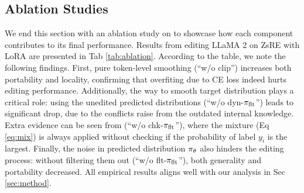 




\subsection{Ablation Studies}
\label{sec:exp:ablation}

We end this section with an ablation study on {\NAME} to showcase how each component contributes to its final performance.
Results from editing LLaMA 2 on ZsRE with LoRA are presented in Tab \ref{tab:ablation}. 
According to the table, we note the following findings. 
First, pure token-level smoothing (``w/o clip'') increases both portability and locality, confirming that overfiting due to CE loss indeed hurts editing performance. 
Additionally, the way to smooth target distribution plays a critical role: 
using the unedited predicted distributions (``w/o dyn-$\pi_\text{flt}$'') leads to significant drop, due to the conflicts raise from the outdated internal knowledge. 
Extra evidence can be seen from (``w/o chk-$\pi_\text{flt}$''), where the mixture (Eq \eqref{eq:mix}) is always applied without checking if the probability of label $y_i$ is the largest.
Finally, the noise in predicted distribution $\pi_\theta$ also hinders the editing process: 
without filtering them out (``w/o flt-$\pi_\text{flt}$''), both generality and portability decreased. 
All empirical results aligns well with our analysis in Sec \ref{sec:method}. 

